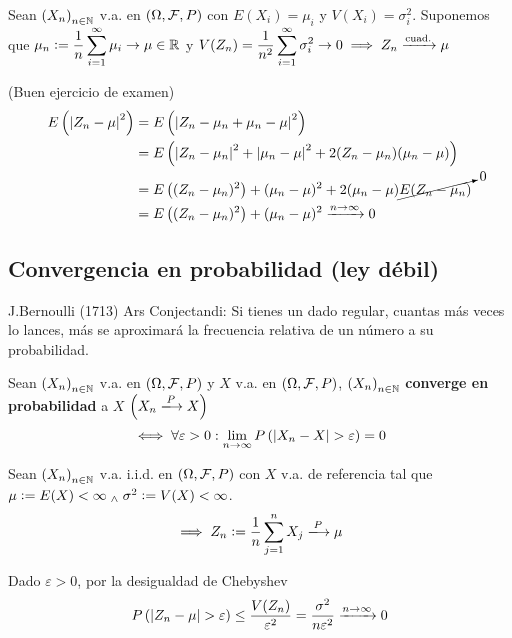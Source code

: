 \begin{teo}
	Sean $\left(X_n\right)_{n\in \mathbb{N}}$ v.a. en $(\Omega, \mathcal{F}, P)$ con $E(X_i) = \mu_i$ y $V(X_i) = \sigma_i^2$. Suponemos que $\displaystyle \mu_n \vcentcolon= \frac{1}{n}\sum_{i=1}^{\infty} \mu_i \to \mu \in \mathbb{R}$ y $\displaystyle V(Z_n) = \frac{1}{n^2}\sum_{i=1}^{\infty} \sigma_i^2 \to 0 \implies Z_n \xrightarrow{\text{cuad.}} \mu$
	\begin{dem} (Buen ejercicio de examen)%
		\[\begin{aligned}
				E\left(\left|Z_n - \mu\right|^2\right) & = E\left(\left|Z_n - \mu_n + \mu_n - \mu\right|^2\right)                                                \\
				                                & = E\left(\left|Z_n - \mu_n\right|^2 + \left|\mu_n - \mu\right|^2 + 2(Z_n - \mu_n)(\mu_n - \mu)\right)          \\
				                                & = E\left((Z_n - \mu_n)^2\right) + {(\mu_n - \mu)^2} + 2(\mu_n - \mu)\cancelto{0}{E(Z_n - \mu_n)} \\
				                                & = E\left((Z_n - \mu_n)^2\right) + (\mu_n - \mu)^2 \xrightarrow{n\to\infty} 0
			\end{aligned}\]
	\end{dem}
\end{teo}

\subsection{Convergencia en probabilidad (ley débil)}

J.Bernoulli (1713) Ars Conjectandi: Si tienes un dado regular, cuantas más veces lo lances, más se aproximará la frecuencia relativa de un número a su probabilidad.

\begin{defn}
	Sean $\left(X_n\right)_{n\in \mathbb{N}}$ v.a. en $(\Omega, \mathcal{F}, P)$ y $X$ v.a. en $(\Omega, \mathcal{F}, P)$, $\left(X_n\right)_{n\in \mathbb{N}}$ \textbf{converge en probabilidad} a $X$ $\left(X_n \xlongrightarrow{P} X\right)$
	\[\iff \forall \varepsilon > 0 : \lim_{n\to\infty} P\left(\left|X_n - X\right| > \varepsilon\right) = 0\]
\end{defn} %

\begin{teo}
	Sean $\left(X_n\right)_{n\in \mathbb{N}}$ v.a. i.i.d. en $(\Omega, \mathcal{F}, P)$ con $X$ v.a. de referencia tal que $\mu \vcentcolon= E(X) < \infty \; _{\wedge} \; \sigma^2 \vcentcolon= V(X) < \infty$.
	\[\implies Z_n \defeq \frac{1}{n} \sum_{j=1}^{n} X_j \xlongrightarrow{P} \mu\]
	\begin{dem}
		Dado $\varepsilon > 0$, por la desigualdad de Chebyshev
		\[P\left(\left|Z_n - \mu\right| > \varepsilon \right) \leq \frac{V(Z_n)}{\varepsilon^2} = \frac{\sigma^2}{n\varepsilon^2} \xrightarrow{n\to\infty} 0\]
	\end{dem}
\end{teo}

